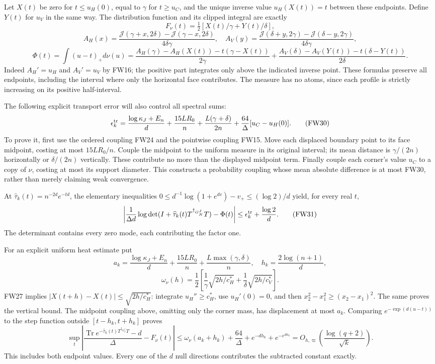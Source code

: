 \documentclass[11pt]{article}
\begin{document}
Let \(X(t)\) be zero for \(t\le u_H(0)\), equal to \(\gamma\) for \(t\ge u_C\), and the unique inverse value \(u_H(X(t))=t\) between these endpoints. Define \(Y(t)\) for \(u_V\) in the same way. The distribution function and its clipped integral are exactly \[
F_\nu(t)=\tfrac12[X(t)/\gamma+Y(t)/\delta],
\tag{FW28}
\] \[
A_H(x)=\frac{\mathscr J(\gamma+x,2\delta)-\mathscr J(\gamma-x,2\delta)}{4\delta\gamma},\quad
A_V(y)=\frac{\mathscr J(\delta+y,2\gamma)-\mathscr J(\delta-y,2\gamma)}{4\delta\gamma},
\] \[
\Phi(t)=\int(u-t)_+d\nu(u)
=\frac{A_H(\gamma)-A_H(X(t))-t(\gamma-X(t))}{2\gamma}
+\frac{A_V(\delta)-A_V(Y(t))-t(\delta-Y(t))}{2\delta}.
\tag{FW29}
\] Indeed \(A_H'=u_H\) and \(A_V'=u_V\) by FW16; the positive part integrates only above the indicated inverse point. These formulas preserve all endpoints, including the interval where only the horizontal face contributes. The measure has no atoms, since each profile is strictly increasing on its positive half-interval.

The following explicit transport error will also control all spectral sums: \[
\epsilon_k^{\rm tr}=\frac{\log\kappa_J+E_n}{d}
+\frac{15LR_0}{n}+\frac{L(\gamma+\delta)}{2n}
+\frac{64}{\Delta}[u_C-u_H(0)].
\tag{FW30}
\] To prove it, first use the ordered coupling FW24 and the pointwise coupling FW15. Move each displaced boundary point to its face midpoint, costing at most \(15LR_0/n\). Couple the midpoint to the uniform measure in its original interval; its mean distance is \(\gamma/(2n)\) horizontally or \(\delta/(2n)\) vertically. These contribute no more than the displayed midpoint term. Finally couple each corner's value \(u_C\) to a copy of \(\nu\), costing at most its support diameter. This constructs a probability coupling whose mean absolute difference is at most FW30, rather than merely claiming weak convergence.

At \(\widehat\tau_k(t)=n^{-2d}e^{-td}\), the elementary inequalities \(0\le d^{-1}\log(1+e^{dv})-v_+\le(\log2)/d\) yield, for every real \(t\), \[
\left|\frac1{\Delta d}\log\det(I+\widehat\tau_k(t)T^{\dagger_{G_N^J}}T)-\Phi(t)\right|
\le\epsilon_k^{\rm tr}+\frac{\log2}{d}.
\tag{FW31}
\] The determinant contains every zero mode, each contributing the factor one.

For an explicit uniform heat estimate put \[
a_k=\frac{\log\kappa_J+E_n}{d}+\frac{15LR_0}{n}+\frac{L\max(\gamma,\delta)}{n},
\quad h_k=\frac{2\log(n+1)}d,
\] \[
\omega_\nu(h)=\frac12\left[\frac1\gamma\sqrt{2h/c_H^*}+\frac1\delta\sqrt{2h/c_V^*}\right].
\] FW27 implies \(|X(t+h)-X(t)|\le\sqrt{2h/c_H^*}\): integrate \(u_H''\ge c_H^*\), use \(u_H'(0)=0\), and then \(x_2^2-x_1^2\ge(x_2-x_1)^2\). The same proves the vertical bound. The midpoint coupling above, omitting only the corner mass, has displacement at most \(a_k\). Comparing \(e^{-\exp(d(u-t))}\) to the step function outside \([t-h_k,t+h_k]\) proves \[
\sup_t\left|\frac{\operatorname{Tr}e^{-\widehat\tau_k(t)T^{\dagger_{G_N^J}}T}-d}{\Delta}-F_\nu(t)\right|
\le\omega_\nu(a_k+h_k)+\frac{64}{\Delta}+e^{-dh_k}+e^{-e^{dh_k}}
=O_{h,\varpi}\!\left(\frac{\log(q+2)}{\sqrt k}\right).
\tag{FW32}
\] This includes both endpoint values. Every one of the \(d\) null directions contributes the subtracted constant exactly.
\end{document}
